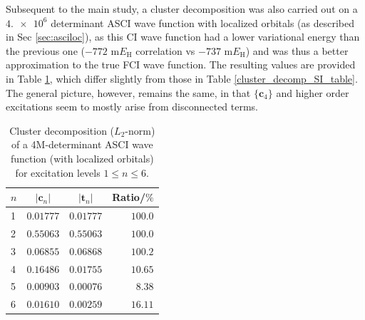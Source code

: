 \documentclass[journal=jcp,manuscript=suppinfo]{achemso}
\begin{document}
Subsequent to the main study, a cluster decomposition was also carried out on a $\num{4.e6}$ determinant ASCI wave function with localized orbitals (as described in Sec \ref{sec:asciloc}), as this CI wave function had a lower variational energy than the previous one ($-772$ m$E_{\text{H}}$ correlation vs $-737$ m$E_{\text{H}}$) and was thus a better approximation to the true FCI wave function. The resulting values are provided in Table \ref{cluster_decomp_SI_table2}, which differ slightly from those in Table \ref{cluster_decomp_SI_table}. The general picture, however, remains the same, in that $\{\bm{c}_4\}$ and higher order excitations seem to mostly arise from disconnected terms. 

\begin{table}[ht!]
	\begin{center}
		\caption{Cluster decomposition ($L_2$-norm) of a 4M-determinant ASCI wave function (with localized orbitals) for excitation levels $1 \leq n \leq 6$.}
		\label{cluster_decomp_SI_table2}
		\begin{tabular}{l|r|r|r}
			\toprule
			\multicolumn{1}{c|}{$n$} & \multicolumn{1}{c|}{$|\bm{c}_n|$} & \multicolumn{1}{c|}{$|\bm{t}_n|$} & \multicolumn{1}{c}{Ratio/$\%$} \\
			\midrule\midrule
			1&	$0.01777$ &	$0.01777$&	$100.0$\\
			2&	$0.55063$ &	$0.55063$&	$100.0$\\
			3&	$0.06855$ &	$0.06868$&	$100.2$\\
			4&	$0.16486$ &	$0.01755$&	$10.65$\\
			5&	$0.00903$ &	$0.00076$&	$8.38$\\
			6&	$0.01610$ &	$0.00259$&	$16.11$\\
			\midrule
		\end{tabular}
		\vspace{-0.6cm}
	\end{center}
\end{table}


\newpage



%
\end{document}
